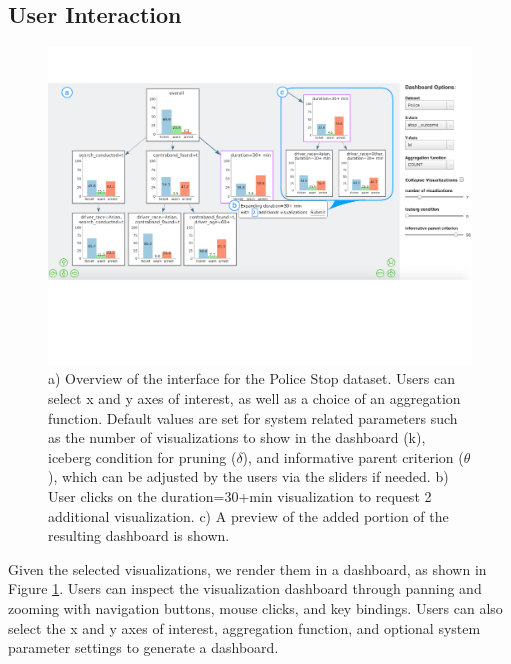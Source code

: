 \subsection{User Interaction\label{sec:interaction}}
\begin{figure}[ht!]
\centering
\includegraphics[width=0.95\linewidth,frame]{figures/overview_interface_expand.pdf}
\caption{a) Overview of the \system interface for the Police Stop dataset. Users can select x and y axes of interest, as well as a choice of an aggregation function. Default values are set for system related parameters such as the number of visualizations to show in the dashboard (k), iceberg condition for pruning ($\delta$), and informative parent criterion ($\theta$), which can be adjusted by the users via the sliders if needed. b) User clicks on the duration=30+min visualization to request 2 additional visualization. c) A preview of the added portion of the resulting dashboard is shown.}
\label{fig:overview}
\end{figure}
\par Given the selected visualizations, we render them in a dashboard, as shown in Figure \ref{fig:overview}. Users can inspect the visualization dashboard through panning and zooming with navigation buttons, mouse clicks, and key bindings. Users can also select the x and y axes of interest, aggregation function, and optional system parameter settings to generate a dashboard.  
